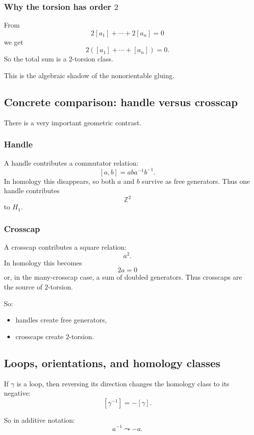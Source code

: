 \documentclass[12pt,a4paper]{article}
\newcommand{\Z}{\mathbb{Z}}
\theoremstyle{notespace}
\begin{document}
\subsubsection*{Why the torsion has order \(2\)}

From
\[
2[a_1]+\cdots+2[a_n]=0
\]
we get
\[
2([a_1]+\cdots+[a_n])=0.
\]
So the total sum is a \(2\)-torsion class.

This is the algebraic shadow of the nonorientable gluing.

\subsection{Concrete comparison: handle versus crosscap}

There is a very important geometric contrast.

\subsubsection*{Handle}

A handle contributes a commutator relation:
\[
[a,b]=aba^{-1}b^{-1}.
\]
In homology this disappears, so both \(a\) and \(b\) survive as free generators. Thus one handle contributes
\[
\Z^2
\]
to \(H_1\).

\subsubsection*{Crosscap}

A crosscap contributes a square relation:
\[
a^2.
\]
In homology this becomes
\[
2a=0
\]
or, in the many-crosscap case, a sum of doubled generators. Thus crosscaps are the source of \(2\)-torsion.

So:
\begin{itemize}
	\item handles create free generators,
	\item crosscaps create \(2\)-torsion.
\end{itemize}

\subsection{Loops, orientations, and homology classes}

If \(\gamma\) is a loop, then reversing its direction changes the homology class to its negative:
\[
[\gamma^{-1}]=-[\gamma].
\]

So in additive notation:
\[
a^{-1} \leadsto -a.
\]
\end{document}
